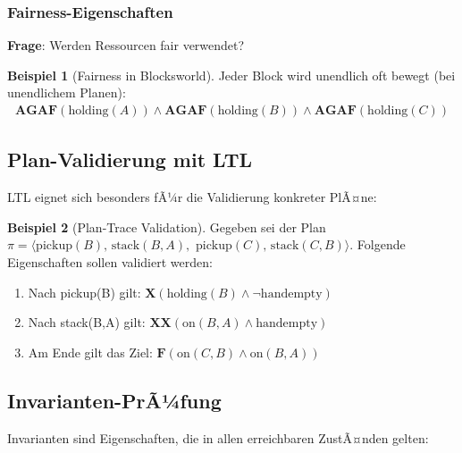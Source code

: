 ﻿\documentclass[a4paper,12pt]{article}
\theoremstyle{definition}
\newtheorem{beispiel}{Beispiel}[section]
\begin{document}
\subsubsection{Fairness-Eigenschaften}

\textbf{Frage}: Werden Ressourcen fair verwendet?

\begin{beispiel}[Fairness in Blocksworld]
	Jeder Block wird unendlich oft bewegt (bei unendlichem Planen):
	\begin{align}
	\mathbf{AG}\mathbf{AF}(\text{holding}(A)) \land \mathbf{AG}\mathbf{AF}(\text{holding}(B)) \land \mathbf{AG}\mathbf{AF}(\text{holding}(C))
	\end{align}
\end{beispiel}

\subsection{Plan-Validierung mit LTL}

LTL eignet sich besonders fÃ¼r die Validierung konkreter PlÃ¤ne:

\begin{beispiel}[Plan-Trace Validation]
	Gegeben sei der Plan $\pi = \langle \text{pickup}(B),\, \text{stack}(B,A),$
	$\text{pickup}(C),\, \text{stack}(C,B) \rangle$.
	Folgende Eigenschaften sollen validiert werden:
	\begin{enumerate}
		\item Nach pickup(B) gilt: $\mathbf{X}(\text{holding}(B) \land \neg\text{handempty})$
		\item Nach stack(B,A) gilt: $\mathbf{X}\mathbf{X}(\text{on}(B,A) \land \text{handempty})$
		\item Am Ende gilt das Ziel: $\mathbf{F}(\text{on}(C,B) \land \text{on}(B,A))$
	\end{enumerate}
\end{beispiel}

\subsection{Invarianten-PrÃ¼fung}

Invarianten sind Eigenschaften, die in allen erreichbaren ZustÃ¤nden gelten:
\end{document}
